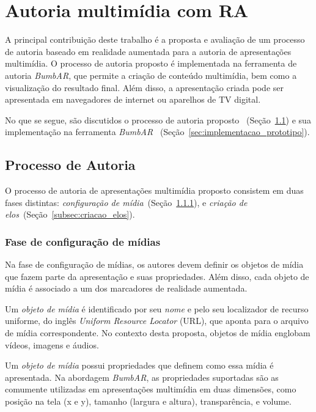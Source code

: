 \documentclass[../main.tex]{subfiles}
\begin{document}
\chapter{Autoria multimídia com RA}\label{cap:proposta}

A principal contribuição deste trabalho é a proposta e avaliação de um processo de autoria baseado em realidade aumentada para a autoria de apresentações multimídia. O processo de autoria proposto é implementada na ferramenta de autoria \emph{BumbAR}, que permite a criação de conteúdo multimídia, bem como a visualização do resultado final. Além disso, a apresentação criada pode ser apresentada em navegadores de internet ou aparelhos de TV digital.

No que se segue, são discutidos o processo de autoria proposto ~(Seção~\ref{sec:processo_autoria}) e sua implementação na ferramenta \emph{BumbAR} ~(Seção~\ref{sec:implementacao_prototipo}).

\section{Processo de Autoria}
\label{sec:processo_autoria}

O processo de autoria de apresentações multimídia proposto consistem em duas fases distintas: \emph{configuração de mídia}~(Seção~\ref{subsec:midias_configuracao}), e \emph{criação de elos}~(Seção~\ref{subsec:criacao_elos}).

\subsection{Fase de configuração de mídias}
\label{subsec:midias_configuracao}

Na fase de configuração de mídias, os autores devem definir os objetos de mídia que fazem parte da apresentação e suas propriedades. Além disso, cada objeto de mídia é associado a um dos marcadores de realidade aumentada.

Um \emph{objeto de mídia} é identificado por seu \emph{nome} e pelo seu localizador de recurso uniforme, do inglês \emph{Uniform Resource Locator} (URL), que aponta para o arquivo de mídia correspondente. No contexto desta proposta, objetos de mídia englobam vídeos, imagens e áudios.

Um \emph{objeto de mídia} possui propriedades que definem como essa mídia é apresentada. Na abordagem \emph{BumbAR}, as propriedades suportadas são as comumente utilizadas em apresentações multimídia em duas dimensões, como posição na tela (x e y), tamanho (largura e altura), transparência, e volume.
\end{document}
